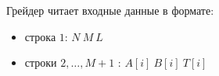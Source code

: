 Грейдер читает входные данные в формате:
\begin{itemize}
\item строка $1$: $N\ M\ L$
\item строки $2, \dots, M + 1$ : $A[i]\ B[i]\ T[i]$
\end{itemize}
